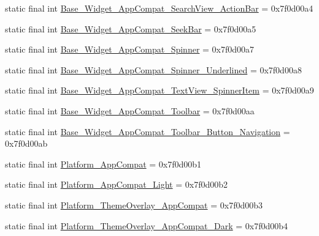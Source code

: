 \begin{DoxyCompactItemize}
\item 
static final int \mbox{\hyperlink{classcom_1_1google_1_1android_1_1gms_1_1R_1_1style_ab21d7c84442c1679bd2668e230d8f435}{Base\+\_\+\+Widget\+\_\+\+App\+Compat\+\_\+\+Search\+View\+\_\+\+Action\+Bar}} = 0x7f0d00a4
\item 
static final int \mbox{\hyperlink{classcom_1_1google_1_1android_1_1gms_1_1R_1_1style_ae7711c2407ea74ffe217729fed3d0fea}{Base\+\_\+\+Widget\+\_\+\+App\+Compat\+\_\+\+Seek\+Bar}} = 0x7f0d00a5
\item 
static final int \mbox{\hyperlink{classcom_1_1google_1_1android_1_1gms_1_1R_1_1style_a9627ced338e0a184ee76251a63dcf746}{Base\+\_\+\+Widget\+\_\+\+App\+Compat\+\_\+\+Spinner}} = 0x7f0d00a7
\item 
static final int \mbox{\hyperlink{classcom_1_1google_1_1android_1_1gms_1_1R_1_1style_aa59f17836ad75e3d5946f62d62d15e62}{Base\+\_\+\+Widget\+\_\+\+App\+Compat\+\_\+\+Spinner\+\_\+\+Underlined}} = 0x7f0d00a8
\item 
static final int \mbox{\hyperlink{classcom_1_1google_1_1android_1_1gms_1_1R_1_1style_a692e2d76e986132b6e855d3d8c00dedf}{Base\+\_\+\+Widget\+\_\+\+App\+Compat\+\_\+\+Text\+View\+\_\+\+Spinner\+Item}} = 0x7f0d00a9
\item 
static final int \mbox{\hyperlink{classcom_1_1google_1_1android_1_1gms_1_1R_1_1style_a86509cb1b361cf6ad59625358a64470b}{Base\+\_\+\+Widget\+\_\+\+App\+Compat\+\_\+\+Toolbar}} = 0x7f0d00aa
\item 
static final int \mbox{\hyperlink{classcom_1_1google_1_1android_1_1gms_1_1R_1_1style_a3de56263ebbd418fa887481a00af42eb}{Base\+\_\+\+Widget\+\_\+\+App\+Compat\+\_\+\+Toolbar\+\_\+\+Button\+\_\+\+Navigation}} = 0x7f0d00ab
\item 
static final int \mbox{\hyperlink{classcom_1_1google_1_1android_1_1gms_1_1R_1_1style_a49d443f276663148a99f0e0dd1711cd5}{Platform\+\_\+\+App\+Compat}} = 0x7f0d00b1
\item 
static final int \mbox{\hyperlink{classcom_1_1google_1_1android_1_1gms_1_1R_1_1style_aaed3c8720bcd953ab34bc3353c9ef821}{Platform\+\_\+\+App\+Compat\+\_\+\+Light}} = 0x7f0d00b2
\item 
static final int \mbox{\hyperlink{classcom_1_1google_1_1android_1_1gms_1_1R_1_1style_a0cb5e0a366fb9dbb658eaf6541db7066}{Platform\+\_\+\+Theme\+Overlay\+\_\+\+App\+Compat}} = 0x7f0d00b3
\item 
static final int \mbox{\hyperlink{classcom_1_1google_1_1android_1_1gms_1_1R_1_1style_a98af9c986f08ee8d6e49f53941f1de5a}{Platform\+\_\+\+Theme\+Overlay\+\_\+\+App\+Compat\+\_\+\+Dark}} = 0x7f0d00b4

\end{DoxyCompactItemize}
